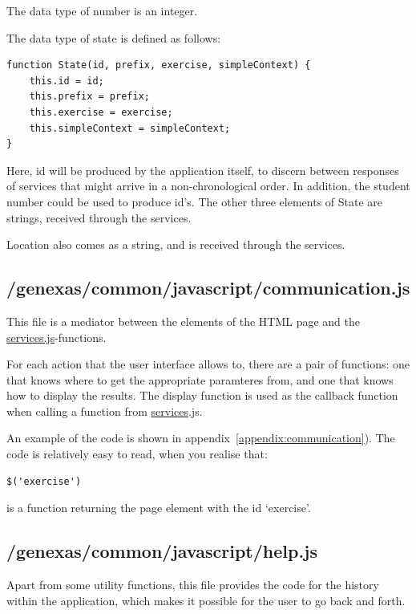 \documentclass{article}
\begin{document}
The data type of number is an integer.

The data type of state is defined as follows:
\begin{verbatim}
function State(id, prefix, exercise, simpleContext) {
    this.id = id;
    this.prefix = prefix;
    this.exercise = exercise;
    this.simpleContext = simpleContext;
}
\end{verbatim}
Here, id will be produced by the application itself, to discern between responses of services that might arrive in a non-chronological order. In addition, the student number could be used to produce id's. The other three elements of State are strings, received through the services.

Location also comes as a string, and is received through the services.

\subsection{/genexas/common/javascript/communication.js}
This file is a mediator between the elements of the HTML page and the \url{services.js}-functions. 

For each action that the user interface allows to, there are a pair of functions: one that knows where to get the appropriate paramteres from, and one that knows how to display the results. The display function is used as the callback function when calling a function from \url{services}.js.

An example of the code is shown in appendix~\ref{appendix:communication}). The code is relatively easy to read, when you realise that:
\begin{verbatim}
$('exercise')
\end{verbatim}
is a function returning the page element with the id `exercise'.

\subsection{/genexas/common/javascript/help.js}
Apart from some utility functions, this file provides the code for the history within the application, which makes it possible for the user to go back and forth.
\end{document}
